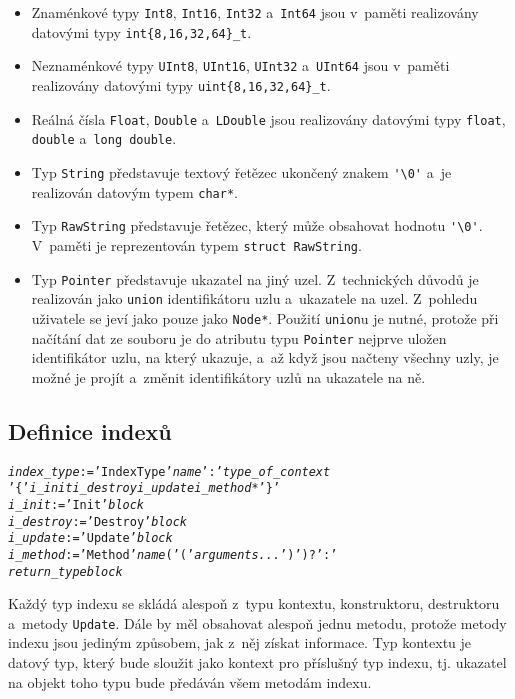 \begin{itemize}
  \item Znaménkové typy \verb|Int8|, \verb|Int16|, \verb|Int32| a~\verb|Int64|
    jsou v~paměti realizovány datovými typy \verb|int{8,16,32,64}_t|.
  \item Neznaménkové typy \verb|UInt8|, \verb|UInt16|, \verb|UInt32| a~\verb|UInt64|
    jsou v~paměti realizovány datovými typy \verb|uint{8,16,32,64}_t|.
  \item Reálná čísla \verb|Float|, \verb|Double| a~\verb|LDouble| jsou realizovány
    datovými typy \verb|float|, \verb|double| a~\verb|long double|.
  \item Typ \verb|String| představuje textový řetězec ukončený znakem \verb|'\0'|
    a~je realizován datovým typem \verb|char*|.
  \item Typ \verb|RawString| představuje řetězec, který může obsahovat hodnotu
    \verb|'\0'|. V~paměti je reprezentován typem \verb|struct RawString|.
  \item Typ \verb|Pointer| představuje ukazatel na jiný uzel. Z~technických důvodů
    je realizován jako \verb|union| identifikátoru uzlu a~ukazatele na uzel. Z~pohledu
    uživatele se jeví jako pouze jako \verb|Node*|. Použití \verb|union|u je nutné,
    protože při načítání dat ze souboru je do atributu typu \verb|Pointer|
    nejprve uložen identifikátor uzlu, na který ukazuje, a~až když jsou načteny
    všechny uzly,
    je možné je projít a~změnit identifikátory uzlů na ukazatele na ně.
\end{itemize}


\subsection{Definice indexů}
\begin{alltt}
{\sl{}index\_type} := 'IndexType' {\sl{}name} ':' {\sl{}type\_of\_context}
              '\{' {\sl{}i\_init i\_destroy i\_update i\_method}* '\}'
{\sl{}i\_init} := 'Init' {\sl{}block}
{\sl{}i\_destroy} := 'Destroy' {\sl{}block}
{\sl{}i\_update} := 'Update' {\sl{}block}
{\sl{}i\_method} := 'Method' {\sl{}name} ( '(' {\sl{}arguments...} ')' )? ':' 
            {\sl{}return\_type block}
\end{alltt}

Každý typ indexu se skládá alespoň z~typu kontextu, konstruktoru, destruktoru
a~metody \verb|Update|. Dále by měl obsahovat alespoň jednu metodu, protože
metody indexu jsou jediným způsobem, jak z~něj získat informace.
Typ kontextu je datový typ, který bude sloužit jako kontext 
pro příslušný typ indexu,
tj. ukazatel na objekt toho typu bude předáván všem metodám indexu.

